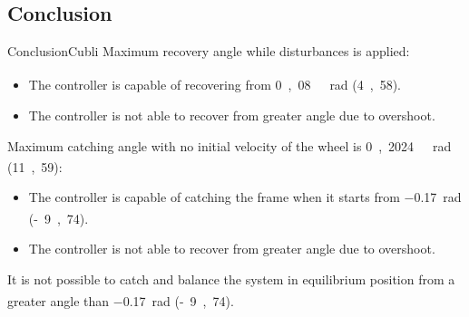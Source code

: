 \subsection{Conclusion}


\begin{frame}{Conclusion}{Cubli}
Maximum recovery angle while disturbances is applied:
	\begin{itemize}
	
		\item {The controller is capable of recovering from \si{0,08\ rad} (\si{4,58^\circ}).}
		\item {The controller is not able to recover from greater angle due to overshoot.}\linebreak
	\end{itemize}
	
Maximum catching angle with no initial velocity of the wheel is \si{0,2024\ rad} (\si{11,59^\circ}):
	\begin{itemize}
		\item {The controller is capable of catching the frame when it starts from \SI{-0,17}{rad}  (\si{-9,74^\circ}).}
		\item {The controller is not able to recover from greater angle due to overshoot.}\linebreak
	\end{itemize}
It is not possible to catch and balance the system in equilibrium position from a  greater angle than \SI{-0,17}{rad}  (\si{-9,74^\circ}).\linebreak

%
%
%	


	

	

	

	
\end{frame}
